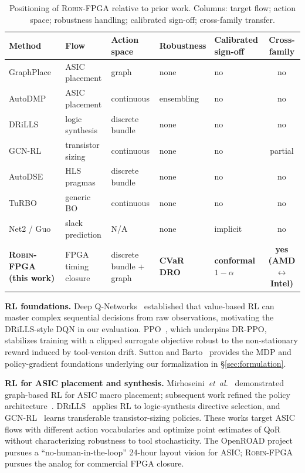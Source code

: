 \documentclass[journal]{IEEEtran}
\begin{document}
\begin{table}[t]
\caption{Positioning of \textsc{Robin-FPGA} relative to prior work. Columns: target flow; action space; robustness handling; calibrated sign-off; cross-family transfer.}
\label{tab:relwork}
\centering
\renewcommand{\arraystretch}{1.10}
\footnotesize
\begin{tabular}{@{}lllllc@{}}
\toprule
Method & Flow & Action space & Robustness & Calibrated sign-off & Cross-family \\
\midrule
GraphPlace~\cite{mirhoseini2021nature}      & ASIC placement   & graph     & none        & no & no \\
AutoDMP~\cite{agnesina2023autodmp}           & ASIC placement   & continuous & ensembling  & no & no \\
DRiLLS~\cite{hosny2020drills}                & logic synthesis  & discrete bundle & none   & no & no \\
GCN-RL~\cite{wang2020gcnrl}                  & transistor sizing & continuous & none      & no & partial \\
AutoDSE~\cite{sohrabizadeh2022autodse}        & HLS pragmas      & discrete bundle & none   & no & no \\
TuRBO~\cite{eriksson2019turbo}                & generic BO       & continuous & none      & no & no \\
Net2 / Guo~\cite{barboza2019net2,guo2022timing} & slack prediction & N/A & none & implicit & no \\
\textbf{\textsc{Robin-FPGA} (this work)}     & FPGA timing closure & discrete bundle + graph & \textbf{CVaR DRO} & \textbf{conformal $1{-}\alpha$} & \textbf{yes (AMD$\leftrightarrow$Intel)} \\
\bottomrule
\end{tabular}
\end{table}

\textbf{RL foundations.} Deep Q-Networks~\cite{mnih2015human} established that value-based RL can master complex sequential decisions from raw observations, motivating the DRiLLS-style DQN in our evaluation. PPO~\cite{schulman2017ppo}, which underpins DR-PPO, stabilizes training with a clipped surrogate objective robust to the non-stationary reward induced by tool-version drift. Sutton and Barto~\cite{sutton2018reinforcement} provides the MDP and policy-gradient foundations underlying our formalization in \S\ref{sec:formulation}.

\textbf{RL for ASIC placement and synthesis.} Mirhoseini~\emph{et~al.}~\cite{mirhoseini2021nature} demonstrated graph-based RL for ASIC macro placement; subsequent work refined the policy architecture~\cite{agnesina2023autodmp,cheng2021joint}. \textsc{DRiLLS}~\cite{hosny2020drills} applies RL to logic-synthesis directive selection, and \textsc{GCN-RL}~\cite{wang2020gcnrl} learns transferable transistor-sizing policies. These works target ASIC flows with different action vocabularies and optimize point estimates of QoR without characterizing robustness to tool stochasticity. The OpenROAD project~\cite{ajayi2019openroad} pursues a ``no-human-in-the-loop'' 24-hour layout vision for ASIC; \textsc{Robin-FPGA} pursues the analog for commercial FPGA closure.
\end{document}

